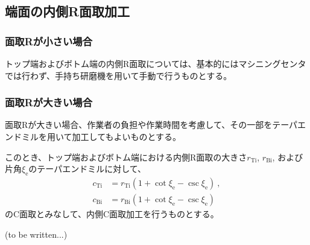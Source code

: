 \subsection{端面の内側R面取加工}

\subsubsection{面取Rが小さい場合}
トップ端およびボトム端の内側R面取については、基本的にはマシニングセンタでは行わず、手持ち研磨機を用いて手動で行うものとする。

\subsubsection{面取Rが大きい場合}
面取Rが大きい場合、作業者の負担や作業時間を考慮して、その一部をテーパエンドミルを用いて加工してもよいものとする。

このとき、トップ端およびボトム端における内側R面取の大きさ$r_\mathrm{Ti}$, $r_\mathrm{Bi}$, および片角$\xi_\mathrm e$のテーパエンドミルに対して、
\begin{align*}
  c_\mathrm{Ti} &= r_\mathrm{Ti}\left(1+\cot\xi_\mathrm e-\csc\xi_\mathrm e\right)\ ,\\
  c_\mathrm{Bi} &= r_\mathrm{Bi}\left(1+\cot\xi_\mathrm e-\csc\xi_\mathrm e\right)
\end{align*}
のC面取とみなして、内側C面取加工を行うものとする。



\clearpage
(to be written...)


\clearpage


